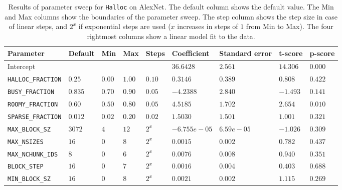 \documentclass[12pt,twoside]{article}
\begin{document}
\begin{table}[!ht]
\caption{Results of parameter sweep for \texttt{Halloc} on AlexNet. The default column shows the default value. The Min and Max columns show the boundaries of the parameter sweep. The step column shows the step size in case of linear steps, and $2^x$ if exponential steps are used ($x$ increases in steps of $1$ from Min to Max). The four rightmost columns show a linear model fit to the data.}
\label{tab:parametersweep}
\begin{adjustwidth}{-0.55cm}{}
\begin{tabular}{|l|l|l|l|l|l|l|l|l|}
\hline
\textbf{Parameter}        & \textbf{Default} & \textbf{Min}  & \textbf{Max}  & \textbf{Steps}         & \textbf{Coefficient} & \textbf{Standard error} & \textbf{t-score} & \textbf{p-score} \\ \hline
Intercept                 &           &        &        &         & $36.6428$     & $2.561$          & $14.306$  & $0.000$   \\ \hline
\texttt{HALLOC\_FRACTION} & $0.25$    & $0.00$ & $1.00$ & $0.10$  & $0.3146$      & $0.389$          & $0.808$   & $0.422$   \\ \hline
\texttt{BUSY\_FRACTION}   & $0.835$   & $0.70$ & $0.90$ & $0.05$  & $-4.2388$     & $2.840$          & $-1.493$  & $0.141$   \\ \hline
\texttt{ROOMY\_FRACTION}  & $0.60$    & $0.50$ & $0.80$ & $0.05$  & $4.5185$      & $1.702$          & $2.654$   & $0.010$   \\ \hline
\texttt{SPARSE\_FRACTION} & $0.012$   & $0.02$ & $0.20$ & $0.02$  & $1.5030$      & $1.501$          & $1.001$   & $0.321$   \\ \hline
\texttt{MAX\_BLOCK\_SZ}   & $3072$    & $4$    & $12$   & $2^x$   & $-6.755e-05$  & $6.59e-05$       & $-1.026$  & $0.309$   \\ \hline
\texttt{MAX\_NSIZES}      & $16$      & $0$    & $8$    & $2^x$   & $0.0015$      & $0.002$          & $0.782$   & $0.437$   \\ \hline
\texttt{MAX\_NCHUNK\_IDS} & $8$       & $0$    & $6$    & $2^x$   & $0.0076$      & $0.008$          & $0.940$   & $0.351$   \\ \hline
\texttt{BLOCK\_STEP}      & $16$      & $0$    & $7$    & $2^x$   & $0.0016$      & $0.004$          & $0.403$   & $0.688$   \\ \hline
\texttt{MIN\_BLOCK\_SZ}   & $16$      & $0$    & $8$    & $2^x$   & $0.0021$      & $0.002$          & $1.115$   & $0.269$   \\ \hline
\end{tabular}
\end{adjustwidth}
\end{table}
\end{document}
